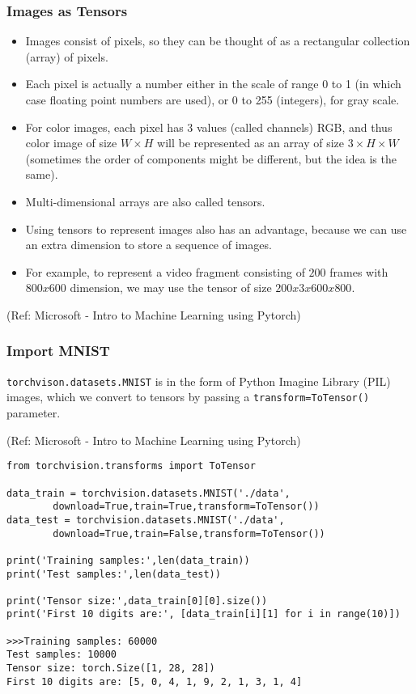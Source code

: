 \begin{frame}[fragile] \frametitle{Images as Tensors}


\begin{itemize}
\item Images consist of pixels, so they can be thought of as a rectangular collection (array) of pixels.
\item Each pixel is actually a number either in the scale of range 0 to 1 (in which case floating point numbers are used), or 0 to 255 (integers), for gray scale.
\item For color images, each pixel has 3 values (called channels) RGB, and thus color image of size  $W×H$  will be represented as an array of size $3×H×W$
  (sometimes the order of components might be different, but the idea is the same).
	\item Multi-dimensional arrays are also called tensors. 
	\item Using tensors to represent images also has an advantage, because we can use an extra dimension to store a sequence of images.
	\item For example, to represent a video fragment consisting of $200$ frames with $800x600$ dimension, we may use the tensor of size $200x3x600x800$.
\end{itemize}


\tiny{(Ref: Microsoft - Intro to Machine Learning using Pytorch)}
\end{frame}


\begin{frame}[fragile] \frametitle{Import MNIST}

\lstinline|torchvison.datasets.MNIST| is  in the form of Python Imagine Library (PIL) images, which we convert to tensors by passing a \lstinline|transform=ToTensor()| parameter.

\tiny{(Ref: Microsoft - Intro to Machine Learning using Pytorch)}

\begin{lstlisting}
from torchvision.transforms import ToTensor

data_train = torchvision.datasets.MNIST('./data',
        download=True,train=True,transform=ToTensor())
data_test = torchvision.datasets.MNIST('./data',
        download=True,train=False,transform=ToTensor())

print('Training samples:',len(data_train))
print('Test samples:',len(data_test))

print('Tensor size:',data_train[0][0].size())
print('First 10 digits are:', [data_train[i][1] for i in range(10)])

>>>Training samples: 60000
Test samples: 10000
Tensor size: torch.Size([1, 28, 28])
First 10 digits are: [5, 0, 4, 1, 9, 2, 1, 3, 1, 4]
\end{lstlisting}



\end{frame}

